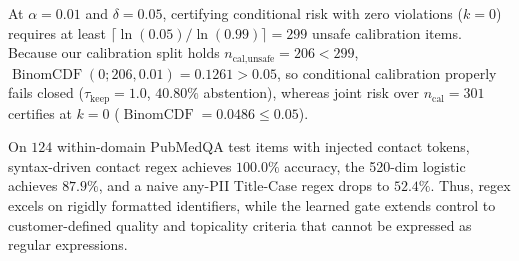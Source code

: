 \documentclass{article}
\begin{document}
\begin{table}[t]
\caption{Single-scorer LTT sweep ($n_{\text{cal}}=301$, $n_{\text{test}}=299$, $\delta=0.05$; $\tau_{\text{drop}}=0.25$ whenever $\tau_{\text{keep}} \ge 0.25$).}
\label{tab:ltt}
\vskip 0.08in
\begin{center}
\end{center}
\vskip -0.14in
\end{table}

At $\alpha=0.01$ and $\delta=0.05$, certifying conditional risk with zero violations ($k=0$) requires at least $\lceil \ln(0.05)/\ln(0.99) \rceil = 299$ unsafe calibration items. Because our calibration split holds $n_{\text{cal,unsafe}}=206 < 299$, $\operatorname{BinomCDF}(0; 206, 0.01) = 0.1261 > 0.05$, so conditional calibration properly fails closed ($\tau_{\text{keep}}=1.0$, $40.80\%$ abstention), whereas joint risk over $n_{\text{cal}}=301$ certifies at $k=0$ ($\operatorname{BinomCDF}=0.0486 \le 0.05$).

On $124$ within-domain PubMedQA test items with injected contact tokens, syntax-driven contact regex achieves $100.0\%$ accuracy, the 520-dim logistic achieves $87.9\%$, and a naive any-PII Title-Case regex drops to $52.4\%$. Thus, regex excels on rigidly formatted identifiers, while the learned gate extends control to customer-defined quality and topicality criteria that cannot be expressed as regular expressions.
\end{document}
